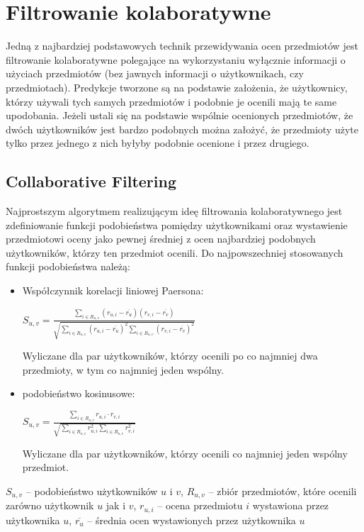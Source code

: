 \documentclass{pracamgr}
\begin{document}
  \section{Filtrowanie kolaboratywne}
   Jedną z najbardziej podstawowych technik przewidywania ocen przedmiotów jest filtrowanie kolaboratywne polegające na wykorzystaniu wyłącznie informacji
   o użyciach przedmiotów (bez jawnych informacji o użytkownikach, czy przedmiotach). Predykcje tworzone są na podstawie założenia, że użytkownicy,
   którzy używali tych samych przedmiotów i podobnie je ocenili mają te same upodobania. Jeżeli ustali się na podstawie wspólnie ocenionych przedmiotów,
   że dwóch użytkowników jest bardzo podobnych można założyć,
   że przedmioty użyte tylko przez jednego z nich byłyby podobnie ocenione i przez drugiego.
   \subsection{Collaborative Filtering}
    Najprostszym algorytmem realizującym ideę filtrowania kolaboratywnego jest zdefiniowanie funkcji podobieństwa pomiędzy użytkownikami
    oraz wystawienie przedmiotowi oceny jako pewnej średniej z ocen najbardziej podobnych użytkowników, którzy ten przedmiot ocenili.\newpage
    Do najpowszechniej stosowanych funkcji podobieństwa należą:
    \begin{itemize}\itemsep1pt \parskip0pt 
     \item Współczynnik korelacji liniowej Paersona:
      \begin{center}
       $S_{u,v}=\frac{\sum\limits_{i\in R_{u,v}}(r_{u,i}-\overline{r_u})(r_{v,i}-\overline{r_v})}
       {\sqrt{\sum\limits_{i\in R_{u,v}}(r_{u,i}-\overline{r_u})^2\sum\limits_{i\in R_{u,v}}(r_{v,i}-\overline{r_v})^2}}$
      \end{center}
      Wyliczane dla par użytkowników, którzy ocenili po co najmniej dwa przedmioty, w tym co najmniej jeden wspólny.
     \item podobieństwo kosinusowe:
      \begin{center}
       $S_{u,v}=\frac{\sum\limits_{i\in R_{u,v}}r_{u,i}\cdot r_{v,i}}
       {\sqrt{\sum\limits_{i\in R_{u,v}}r_{u,i}^2\sum\limits_{i\in R_{u,v}}r_{v,i}^2}}$
      \end{center}
      Wyliczane dla par użytkowników, którzy ocenili co najmniej jeden wspólny przedmiot.
    \end{itemize}
    {\scriptsize
     $S_{u,v}$ -- podobieństwo użytkowników $u$ i $v$, $R_{u,v}$ -- zbiór przedmiotów, które ocenili zarówno użytkownik $u$ jak i $v$,\newline
     $r_{u,i}$ -- ocena przedmiotu $i$ wystawiona przez użytkownika $u$, $\overline{r_{u}}$ -- średnia ocen wystawionych przez użytkownika $u$
    }\newline
\end{document}
